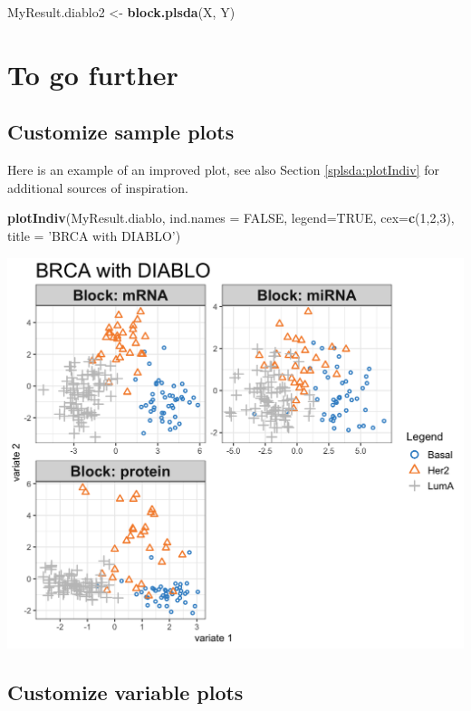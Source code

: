 \documentclass[]{book}
\newenvironment{Shaded}{\begin{snugshade}}{\end{snugshade}}
\newcommand{\KeywordTok}[1]{\textcolor[rgb]{0.13,0.29,0.53}{\textbf{#1}}}
\newcommand{\DataTypeTok}[1]{\textcolor[rgb]{0.13,0.29,0.53}{#1}}
\newcommand{\DecValTok}[1]{\textcolor[rgb]{0.00,0.00,0.81}{#1}}
\newcommand{\StringTok}[1]{\textcolor[rgb]{0.31,0.60,0.02}{#1}}
\newcommand{\OtherTok}[1]{\textcolor[rgb]{0.56,0.35,0.01}{#1}}
\newcommand{\NormalTok}[1]{#1}
\theoremstyle{definition}
\theoremstyle{definition}
\theoremstyle{definition}
\theoremstyle{remark}
\begin{document}
\begin{Shaded}
\begin{Highlighting}[]
\NormalTok{MyResult.diablo2 <-}\StringTok{ }\KeywordTok{block.plsda}\NormalTok{(X, Y)}
\end{Highlighting}
\end{Shaded}

\section{To go further}\label{to-go-further-1}

\subsection{Customize sample plots}\label{diablo:plotIndiv}

Here is an example of an improved plot, see also Section
\ref{splsda:plotIndiv} for additional sources of inspiration.

\begin{Shaded}
\begin{Highlighting}[]
\KeywordTok{plotIndiv}\NormalTok{(MyResult.diablo, }
          \DataTypeTok{ind.names =} \OtherTok{FALSE}\NormalTok{, }
          \DataTypeTok{legend=}\OtherTok{TRUE}\NormalTok{, }\DataTypeTok{cex=}\KeywordTok{c}\NormalTok{(}\DecValTok{1}\NormalTok{,}\DecValTok{2}\NormalTok{,}\DecValTok{3}\NormalTok{),}
          \DataTypeTok{title =} \StringTok{'BRCA with DIABLO'}\NormalTok{)}
\end{Highlighting}
\end{Shaded}

\begin{center}\includegraphics[width=0.5\linewidth]{Figures/unnamed-chunk-4-1} \end{center}

\subsection{Customize variable plots}\label{diablo:plotVar}
\end{document}
